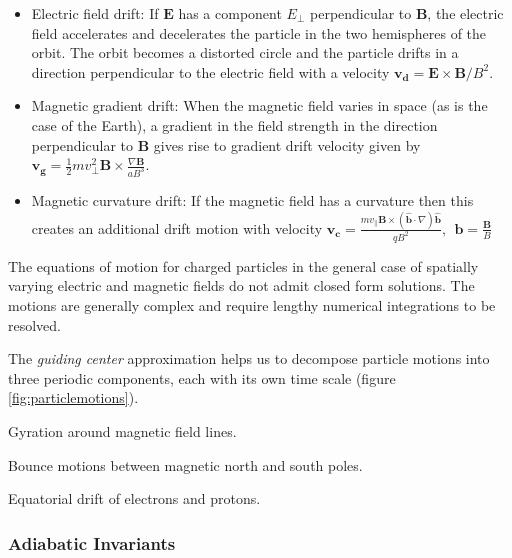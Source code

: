 \begin{itemize}
    \item Electric field drift: If $\mathbf{E}$ has a component $E_{\perp}$ perpendicular to $\mathbf{B}$, the electric 
    field accelerates and decelerates the particle in the two hemispheres of the orbit. The orbit becomes 
    a distorted circle and the particle drifts in a direction perpendicular to the electric field with a velocity 
    $\mathbf{v_d} = \mathbf{E} \times \mathbf{B} / B^2$.

    \item Magnetic gradient drift: When the magnetic field varies in space (as is the case of the Earth), a 
    gradient in the field strength in the direction perpendicular to $\mathbf{B}$ gives rise to gradient 
    drift velocity given by $\mathbf{v_g} = \frac{1}{2} m v^2_{\perp}\mathbf{B} \times \frac{\nabla \mathbf{B}}{aB^3}$.

    \item Magnetic curvature drift: If the magnetic field has a curvature then this creates an additional 
    drift motion with velocity $\mathbf{v_c} = \frac{ m v_{\parallel} 
    \mathbf{B} \times (\hat{\mathbf{b}} \cdot \nabla) \hat{\mathbf{b}} }{qB^2}, 
    \ \ \mathbf{b} = \frac{\mathbf{B}}{B}$
\end{itemize}

The equations of motion for charged particles in the general case of spatially varying electric and magnetic fields 
do not admit closed form solutions. The motions are generally complex and require lengthy numerical integrations 
to be resolved.

The \emph{guiding center} approximation helps us to decompose particle motions into three periodic components, 
each with its own time scale (figure \ref{fig:particlemotions}).
\begin{enumerate*}
    \item Gyration around magnetic field lines.
    \item Bounce motions between magnetic north and south poles.
    \item Equatorial drift of electrons and protons.
\end{enumerate*}

\subsubsection*{Adiabatic Invariants}


